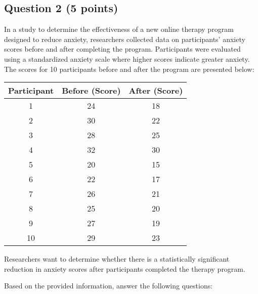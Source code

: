 \documentclass{article}
\begin{document}
\newpage
\subsection*{Question 2 (5 points)}
In a study to determine the effectiveness of a new online therapy program designed to reduce anxiety, researchers collected data on participants' anxiety scores before and after completing the program. Participants were evaluated using a standardized anxiety scale where higher scores indicate greater anxiety. The scores for 10 participants before and after the program are presented below:

\begin{center}
\begin{tabular}{c|c|c}
\hline
\textbf{Participant} & \textbf{Before (Score)} & \textbf{After (Score)} \\ \hline
1 & 24 & 18 \\ \hline
2 & 30 & 22 \\ \hline
3 & 28 & 25 \\ \hline
4 & 32 & 30 \\ \hline
5 & 20 & 15 \\ \hline
6 & 22 & 17 \\ \hline
7 & 26 & 21 \\ \hline
8 & 25 & 20 \\ \hline
9 & 27 & 19 \\ \hline
10 & 29 & 23 \\ \hline
\end{tabular}
\end{center}

Researchers want to determine whether there is a statistically significant reduction in anxiety scores after participants completed the therapy program.

Based on the provided information, answer the following questions:
\end{document}
